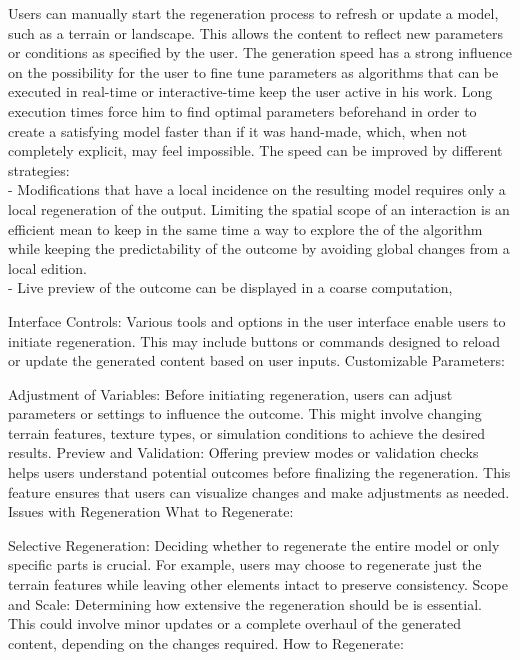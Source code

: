 Users can manually start the regeneration process to refresh or update a model, such as a terrain or landscape. This allows the content to reflect new parameters or conditions as specified by the user. The generation speed has a strong influence on the possibility for the user to fine tune parameters as algorithms that can be executed in real-time or interactive-time keep the user active in his work. Long execution times force him to find optimal parameters beforehand in order to create a satisfying model faster than if it was hand-made, which, when not completely explicit, may feel impossible. 
The speed can be improved by different strategies:  \\
- Modifications that have a local incidence on the resulting model requires only a local regeneration of the output. Limiting the spatial scope of an interaction is an efficient mean to keep in the same time a way to explore the  of the algorithm while keeping the predictability of the outcome by avoiding global changes from a local edition. \\
- Live preview of the outcome can be displayed in a coarse computation, 

Interface Controls: Various tools and options in the user interface enable users to initiate regeneration. This may include buttons or commands designed to reload or update the generated content based on user inputs.
Customizable Parameters:

Adjustment of Variables: Before initiating regeneration, users can adjust parameters or settings to influence the outcome. This might involve changing terrain features, texture types, or simulation conditions to achieve the desired results.
Preview and Validation: Offering preview modes or validation checks helps users understand potential outcomes before finalizing the regeneration. This feature ensures that users can visualize changes and make adjustments as needed.
Issues with Regeneration
What to Regenerate:

Selective Regeneration: Deciding whether to regenerate the entire model or only specific parts is crucial. For example, users may choose to regenerate just the terrain features while leaving other elements intact to preserve consistency.
Scope and Scale: Determining how extensive the regeneration should be is essential. This could involve minor updates or a complete overhaul of the generated content, depending on the changes required.
How to Regenerate:


